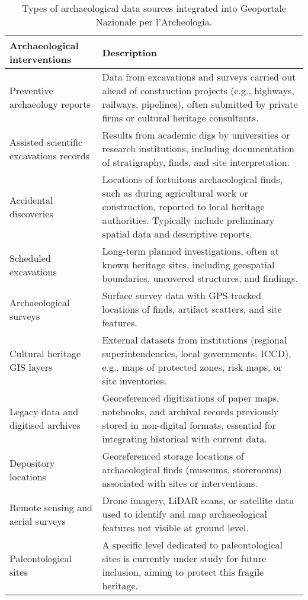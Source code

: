 \begin{spacing}{1.5}
\addtocounter{table}{-1}
\begin{table}[H]
\centering
\footnotesize
\begin{tabularx}{\textwidth}{ l >{\justifying\noindent\arraybackslash}p{} }
\toprule
\textbf{Archaeological interventions} & \textbf{Description} \\
\midrule
Preventive archaeology reports & Data from excavations and surveys carried out ahead of construction projects (e.g., highways, railways, pipelines), often submitted by private firms or cultural heritage consultants. \\
\cmidrule(lr){1-2}
Assisted scientific excavations records & Results from academic digs by universities or research institutions, including documentation of stratigraphy, finds, and site interpretation. \\
\cmidrule(lr){1-2}
Accidental discoveries & Locations of fortuitous archaeological finds, such as during agricultural work or construction, reported to local heritage authorities. Typically include preliminary spatial data and descriptive reports. \\
\cmidrule(lr){1-2}
Scheduled excavations & Long-term planned investigations, often at known heritage sites, including geospatial boundaries, uncovered structures, and findings. \\
\cmidrule(lr){1-2}
Archaeological surveys & Surface survey data with GPS-tracked locations of finds, artifact scatters, and site features. \\
\cmidrule(lr){1-2}
Cultural heritage GIS layers & External datasets from institutions (regional superintendencies, local governments, ICCD), e.g., maps of protected zones, risk maps, or site inventories. \\
\cmidrule(lr){1-2}
Legacy data and digitised archives & Georeferenced digitizations of paper maps, notebooks, and archival records previously stored in non-digital formats, essential for integrating historical with current data. \\
\cmidrule(lr){1-2}
Depository locations & Georeferenced storage locations of archaeological finds (museums, storerooms) associated with sites or interventions. \\
\cmidrule(lr){1-2}
Remote sensing and aerial surveys & Drone imagery, LiDAR scans, or satellite data used to identify and map archaeological features not visible at ground level. \\
\cmidrule(lr){1-2}
Paleontological sites & A specific level dedicated to paleontological sites is currently under study for future inclusion, aiming to protect this fragile heritage. \\
\bottomrule
\end{tabularx}
\vspace{0.5em}
\caption{Types of archaeological data sources integrated into Geoportale Nazionale per l'Archeologia.}
\label{tab:gna_data_sources}
\end{table}


\end{spacing}
